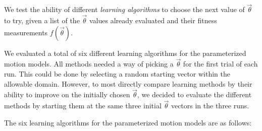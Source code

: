 We test the ability of different \emph{learning algorithms} to choose the next value of $\vec{\theta}$ to try, given a list of the
$\vec{\theta}$ values already evaluated and their fitness measurements $f(\vec{\theta})$.

We evaluated a total of six different
learning algorithms for the parameterized motion models.  All methods
needed a way of picking a $\vec{\theta}$ for the first trial of each run.  This could be done by selecting a random starting vector within the
allowable domain.  However, to most directly compare learning methods
by their ability to improve on the initially chosen $\vec{\theta}$, we
decided to evaluate the different methods by starting them at the same three
initial $\vec{\theta}$ vectors in the three runs. 


The six learning algorithms for the parameterized motion models are as follows:






